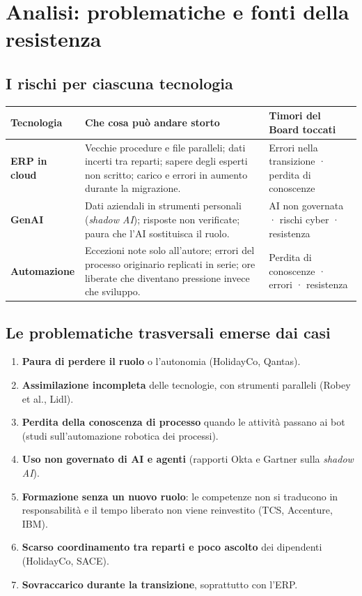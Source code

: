 \documentclass[11pt,a4paper]{article}
\begin{document}
\section{Analisi: problematiche e fonti della resistenza}\label{sec:6}

\subsection{I rischi per ciascuna tecnologia}\label{sec:6.1}

{\small\renewcommand{\arraystretch}{1.25}
\begin{xltabular}{\linewidth}{@{}>{\raggedright\arraybackslash{}\hsize\hspace{0pt}}X>{\raggedright\arraybackslash{}\hsize\hspace{0pt}}X>{\raggedright\arraybackslash{}\hsize\hspace{0pt}}X@{}}
\toprule
\textbf{Tecnologia} & \textbf{Che cosa può andare storto} & \textbf{Timori del Board toccati} \\
\midrule
\endhead
\textbf{ERP in cloud} & Vecchie procedure e file paralleli; dati incerti tra reparti; sapere degli esperti non scritto; carico e errori in aumento durante la migrazione. & Errori nella transizione · perdita di conoscenze \\
\textbf{GenAI} & Dati aziendali in strumenti personali (\emph{shadow AI}); risposte non verificate; paura che l'AI sostituisca il ruolo. & AI non governata · rischi cyber · resistenza \\
\textbf{Automazione} & Eccezioni note solo all'autore; errori del processo originario replicati in serie; ore liberate che diventano pressione invece che sviluppo. & Perdita di conoscenze · errori · resistenza \\
\bottomrule
\end{xltabular}}

\subsection{Le problematiche trasversali emerse dai casi}\label{sec:6.2}
\begin{enumerate}
\item \textbf{Paura di perdere il ruolo} o l'autonomia (HolidayCo, Qantas).
\item \textbf{Assimilazione incompleta} delle tecnologie, con strumenti paralleli (Robey et al., Lidl).
\item \textbf{Perdita della conoscenza di processo} quando le attività passano ai bot (studi sull'automazione robotica dei processi).
\item \textbf{Uso non governato di AI e agenti} (rapporti Okta e Gartner sulla \emph{shadow AI}).
\item \textbf{Formazione senza un nuovo ruolo}: le competenze non si traducono in responsabilità e il tempo liberato non viene reinvestito (TCS, Accenture, IBM).
\item \textbf{Scarso coordinamento tra reparti e poco ascolto} dei dipendenti (HolidayCo, SACE).
\item \textbf{Sovraccarico durante la transizione}, soprattutto con l'ERP.
\end{enumerate}
\end{document}
